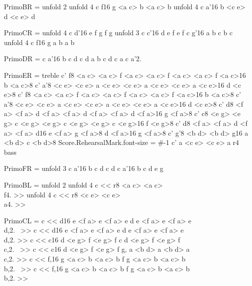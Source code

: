 PrimoBR = {
 \repeat unfold 2 {
   \repeat unfold 4 { \relative c { f16 g <a c> b <a c> b } }
   \repeat unfold 4 { \relative c { a'16 b <c e> d <c e> d } }
 }
}

PrimoCR = {
 \repeat unfold 4 { \relative c { d'16 e f g f g } }
 \repeat unfold 3 { \relative c { c'16 d e f e f } }
 { \relative c { g'16 a b c b c } }
 \repeat unfold 4 { \relative c { f16 g a b a b } }
}

PrimoDR = {
 { \relative c { a'16 b c d c d a b c d c a } }
 { \relative c { a'2. } }
}

PrimoER = {
  \clef treble
  { \relative c' { f8 <a c> <a c> f <a c> <a c> f <a c> <a c> f <a c>16 b <a c>8 } }
  { \relative c' { a'8 <c e> <c e> a <c e> <c e> a <c e> <c e> a <c e>16 d <c e>8 } }
  { \relative c' { f8 <a c> <a c> f <a c> <a c> f <a c> <a c> f <a c>16 b <a c>8 } }
  { \relative c' { a'8 <c e> <c e> a <c e> <c e> a <c e> <c e> a <c e>16 d <c e>8 } }
  { \relative c' { d8 <f a> <f a> d <f a> <f a> d <f a> <f a> d <f a>16 g <f a>8 } }
  { \relative c' { c8 <e g> <e g> c <e g> <e g> c <e g> <e g> c <e g>16 f <e g>8 } }
  { \relative c' { d8 <f a> <f a> d <f a> <f a> d16 e <f a> g <f a>8 d <f a>16 g <f a>8 } }
  { \relative c' { g'8 <b d> <b d> g16 a <b d> c <b d>8 } }
  \once \override Score.RehearsalMark.font-size = #-1
  \mark {}
  { \relative c' { a <c e> <c e> a r4 } }
  \clef bass
}

PrimoFR = {
  \mark {}
  \repeat unfold 3 { \relative c { a'16 b c d c d } }
  { \relative c { a'16 b c d e g } }
}

PrimoBL = {
 \repeat unfold 2 {
   \repeat unfold 4 { \relative c { << { r8 <a c> <a c> } \\ { f4. } >> } }
   \repeat unfold 4 { \relative c { << { r8 <c e> <c e> } \\ { a4. } >> } }
 }
}

PrimoCL = {
 { \relative c { << { d16 e <f a> e <f a> e d e <f a> e <f a> e} \\ { d,2.~ } >> } }
 { \relative c { << { d16 e <f a> e <f a> e d e <f a> e <f a> e} \\ { d,2. } >> } }
 { \relative c { << { c16 d <e g> f <e g> f c d <e g> f <e g> f} \\ { c,2.~ } >> } }
 { \relative c { << { c16 d <e g> f <e g> f g, a <b d> a <b d> a} \\ { c,2. } >> } }
 { \relative c { << { f,16 g <a c> b <a c> b f g <a c> b <a c> b} \\ { b,2.~ } >> } }
 { \relative c { << { f,16 g <a c> b <a c> b f g <a c> b <a c> b} \\ { b,2. } >> } }
}

